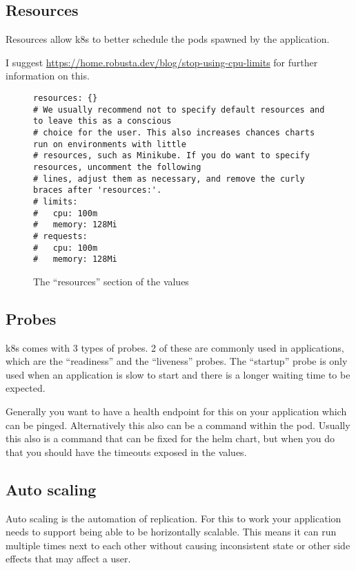 \subsection{Resources}
Resources allow \gls{k8s} to better schedule the pods spawned by the application.

I suggest \url{https://home.robusta.dev/blog/stop-using-cpu-limits} for further information on this.

\begin{figure}[h]
\begin{verbatim}
resources: {}
# We usually recommend not to specify default resources and to leave this as a conscious
# choice for the user. This also increases chances charts run on environments with little
# resources, such as Minikube. If you do want to specify resources, uncomment the following
# lines, adjust them as necessary, and remove the curly braces after 'resources:'.
# limits:
#   cpu: 100m
#   memory: 128Mi
# requests:
#   cpu: 100m
#   memory: 128Mi
\end{verbatim}
\caption{The \enquote{resources} section of the \gls{values}}\label{code:resources_section}
\end{figure}

\subsection{Probes}
\Gls{k8s} comes with 3 types of probes\cite{ConfigureLivenessReadiness}.
2 of these are commonly used in applications, which are the \enquote{readiness} and the \enquote{liveness} probes.
The \enquote{startup} probe is only used when an application is slow to start and there is a longer waiting time to be expected.

Generally you want to have a health endpoint for this on your application which can be pinged.
Alternatively this also can be a command within the pod.
Usually this also is a command that can be fixed for the helm chart, but when you do that you should have the timeouts exposed in the \gls{values}.

\subsection{Auto scaling}
Auto scaling is the automation of replication.
For this to work your application needs to support being able to be horizontally scalable.
This means it can run multiple times next to each other without causing inconsistent state or other side effects that may affect a user.

